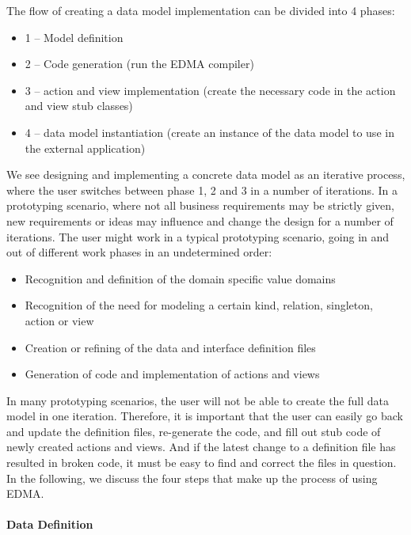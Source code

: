 The flow of creating a data model implementation can be divided into
4 phases:
\begin{itemize}
\item 1 -- Model definition
\item 2 -- Code generation (run the EDMA compiler)
\item 3 -- action and view implementation (create the necessary code in
the action and view stub classes)
\item 4 -- data model instantiation (create an instance of the data model
to use in the external application)
\end{itemize}
We see designing and implementing a concrete data model as an iterative
process, where the user switches between phase 1, 2 and 3 in a number
of iterations. In a prototyping scenario, where not all business requirements
may be strictly given, new requirements or ideas may influence and
change the design for a number of iterations. The user might work
in a typical prototyping scenario, going in and out of different work
phases in an undetermined order:
\begin{itemize}
\item Recognition and definition of the domain specific value domains
\item Recognition of the need for modeling a certain kind, relation, singleton,
action or view
\item Creation or refining of the data and interface definition files
\item Generation of code and implementation of actions and views
\end{itemize}
In many prototyping scenarios, the user will not be able to create
the full data model in one iteration. Therefore, it is important that
the user can easily go back and update the definition files, re-generate
the code, and fill out stub code of newly created actions and views.
And if the latest change to a definition file has resulted in broken
code, it must be easy to find and correct the files in question. In
the following, we discuss the four steps that make up the process
of using EDMA.


\paragraph{Data Definition}


